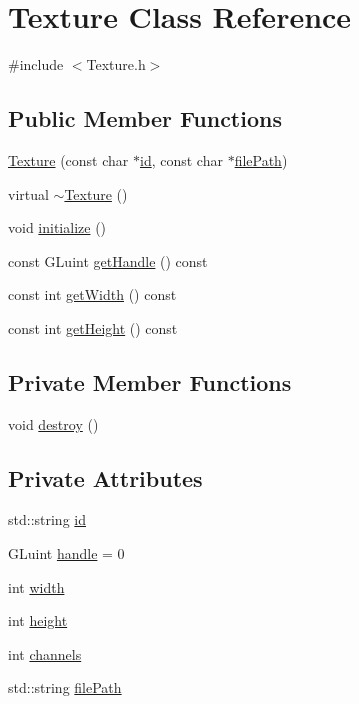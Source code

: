 \hypertarget{class_texture}{}\section{Texture Class Reference}
\label{class_texture}


{\ttfamily \#include $<$Texture.\+h$>$}

\subsection*{Public Member Functions}
\begin{DoxyCompactItemize}
\item 
\hyperlink{class_texture_a09b74fe4a769d09eb0dc6ce263fb21e8}{Texture} (const char $\ast$\hyperlink{class_texture_a2561506eb38c9514c0af65c6041ef8f6}{id}, const char $\ast$\hyperlink{class_texture_a291f56ca05d3e97dc584dd37fe8c66ef}{file\+Path})
\item 
virtual \hyperlink{class_texture_a09c4bcb7462f64c1d20fa69dba3cee8a}{$\sim$\+Texture} ()
\item 
void \hyperlink{class_texture_a26451a093dfccfd4b4ce58b9bd3c7189}{initialize} ()
\item 
const G\+Luint \hyperlink{class_texture_a7cfdb814d042c86a3522d1a9fa10e952}{get\+Handle} () const
\item 
const int \hyperlink{class_texture_af9842e562b0f355f36edac7ab09507a3}{get\+Width} () const
\item 
const int \hyperlink{class_texture_a5353c4a272879e82413fc386076350cc}{get\+Height} () const
\end{DoxyCompactItemize}
\subsection*{Private Member Functions}
\begin{DoxyCompactItemize}
\item 
void \hyperlink{class_texture_a9885329fec4191d5a7aee3d198519ea9}{destroy} ()
\end{DoxyCompactItemize}
\subsection*{Private Attributes}
\begin{DoxyCompactItemize}
\item 
std\+::string \hyperlink{class_texture_a2561506eb38c9514c0af65c6041ef8f6}{id}
\item 
G\+Luint \hyperlink{class_texture_a1dfbb81653c1d0a74ff75006ed7c25a8}{handle} = 0
\item 
int \hyperlink{class_texture_a06a0246cb31343557c3441c5733349cd}{width}
\item 
int \hyperlink{class_texture_ad37c395c65ff8bde86230908027a6fcd}{height}
\item 
int \hyperlink{class_texture_a69c58068e4b82a86d24e8c797705d515}{channels}
\item 
std\+::string \hyperlink{class_texture_a291f56ca05d3e97dc584dd37fe8c66ef}{file\+Path}
\end{DoxyCompactItemize}


